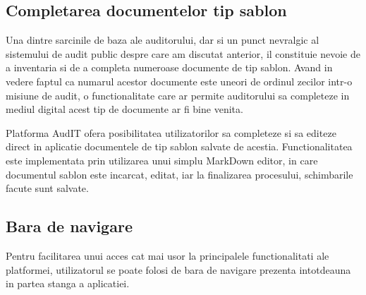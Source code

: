  
 \subsection{Completarea documentelor tip sablon}
 
	Una dintre sarcinile de baza ale auditorului, dar si un punct nevralgic al sistemului de audit public despre care am discutat anterior, il constituie nevoie de a inventaria si de a completa numeroase documente de tip sablon. Avand in vedere faptul ca numarul acestor documente este uneori de ordinul zecilor intr-o misiune de audit, o functionalitate care ar permite auditorului sa completeze in mediul digital acest tip de documente ar fi bine venita.
	
	Platforma AudIT ofera posibilitatea utilizatorilor sa completeze si sa editeze direct in aplicatie documentele de tip sablon salvate de acestia. Functionalitatea este implementata prin utilizarea unui simplu 
	MarkDown editor, in care documentul sablon este incarcat, editat, iar la finalizarea procesului, schimbarile facute sunt salvate.
	
	\subsection{Bara de navigare}
	Pentru facilitarea unui acces cat mai usor la principalele functionalitati ale platformei, utilizatorul se poate folosi de bara de navigare prezenta intotdeauna in partea stanga a aplicatiei.
	
